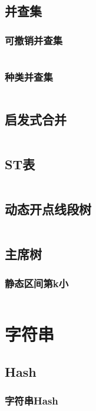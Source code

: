 \documentclass[a4paper,11pt]{article}
\begin{document}
\subsection{并查集} %
\subsubsection{可撤销并查集} %
\inputminted[breaklines]{c++}{数据结构/可撤销并查集.cpp} 

\subsubsection{种类并查集} %
\inputminted[breaklines]{c++}{数据结构/种类并查集.cpp} 

\subsection{启发式合并} %
\inputminted[breaklines]{c++}{数据结构/启发式合并.cpp} 


\subsection{ST表} %
\inputminted[breaklines]{c++}{数据结构/ST表.cpp}

\subsection{动态开点线段树} %
\inputminted[breaklines]{c++}{数据结构/动态开点线段树.cpp}

\subsection{主席树} %
\subsubsection{静态区间第k小} %
\inputminted[breaklines]{c++}{数据结构/静态区间第k小.cpp}


\section{字符串} %
\subsection{Hash} %
\subsubsection{字符串Hash} %
\inputminted[breaklines]{c++}{字符串/字符串Hash.cpp} 
\end{document}
